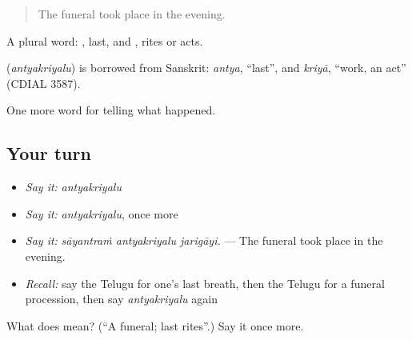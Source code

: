 \begin{quote}
The funeral took place in the evening.
\end{quote}

A plural word: , last, and , rites or acts.

\begin{cousinweb}
\textbf{} (\emph{antyakriyalu}) is borrowed from Sanskrit: \emph{antya}, \textquotedblleft{}last\textquotedblright{}, and \emph{kriyā}, \textquotedblleft{}work, an act\textquotedblright{} (CDIAL 3587).
\end{cousinweb}

\begin{grammarlens}[title={What you've built}]
One more word for telling what happened.
\end{grammarlens}

\subsection*{Your turn}
\begin{itemize}
\raggedright
  \item \emph{Say it:} \emph{antyakriyalu}
  \item \emph{Say it:} \emph{antyakriyalu}, once more
  \item \emph{Say it:} \emph{sāyantraṁ antyakriyalu jarigāyi.} — The funeral took place in the evening.
  \item \emph{Recall:} say the Telugu for one's last breath, then the Telugu for a funeral procession, then say \emph{antyakriyalu} again
\end{itemize}

\begin{tcolorbox}[breakable,colback=teal!4,colframe=teal!35!black,title={Before you move on}]
What does  mean? (\textquotedblleft{}A funeral; last rites\textquotedblright{}.) Say it once more.
\end{tcolorbox}
